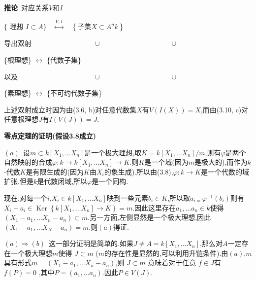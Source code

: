 \documentclass[UTF8]{book}
\begin{document}
		
		\textbf{推论}\ 对应关系$ V $和$ I $
		
		
		\centerline{$\{\text { 理想 } I \subset A \}\quad{\stackrel{ V , I }{\longleftrightarrow}} \quad\left\{\text {子集} X \subset A ^{ n } k \right\}$}
		
		
		导出双射$ \qquad\qquad\qquad\qquad\quad\cup\qquad\qquad\qquad\qquad\qquad\cup $
		

		\centerline{\{根理想\} \qquad $\longleftrightarrow$ \qquad \{代数子集\}}
		
		
		以及$ \qquad\qquad\qquad\qquad\qquad\quad\cup\qquad\qquad\qquad\qquad\qquad\cup $
		
		
		\centerline{\qquad\quad \{素理想\} \qquad $\longleftrightarrow$ \qquad \{不可约代数子集\}}
		
		
		上述双射成立时因为由(3.6, b)对任意代数集$ X $有$ V(I(X))  = X$,而由(3.10, c)对任意根理想$ J $有$ I(V(J))  = J$.
		
		
		\textbf{零点定理的证明(假设3.8成立)}
		
		
		$ (a) $\ 设$m \subset k \left[ X _{1}, \ldots X _{ n }\right]$是一个极大理想,取$K = k \left[ X _{1}, \ldots X _{ n }\right] / m$,则有$ \varphi $是两个自然映射的合成$ \varphi : k \to k \left[ X _{1}, \ldots X _{ n }\right] \to K$.则$ K $是一个域(因为$ m $是极大的),而作为$ k $-代数$ K $是有限生成的(因为$ K $由$ X_{i} $的象生成).所以由(3.8),$ \varphi : k \to K $是一个代数的域扩张.但是$ k $是代数闭域,所以$ \varphi $是一个同构.
		
		
		现在,对每一个$ i $,$X _{ i } \in k \left[ X _{1}, \ldots X _{ n }\right]$映到一些元素$ b_{i} \in K$,所以取$a _{ i =} \varphi^{-1}\left(b _{ i }\right)$则有$X _{ i }- a _{ i } \in \operatorname{Ker}\left\{ k \left[ X _{1}, \ldots X _{ n }\right] \rightarrow K \right\}= m .$因此这里存在$a _{1}, \ldots a _{ n } \in k$使得$\left(X _{1}- a _{1}, \ldots X _{ n }- a _{ n }\right) \subset m .$另一方面,左侧显然是一个极大理想,因此$\left(X _{1}- a _{1}, \ldots X _{ N }- a _{ n }\right)= m .$则$ (a) $得证.
		
		
		$ (a)  \Rightarrow (b) $\ 这一部分证明是简单的.如果$J \neq A = k \left[ X _{1}, \ldots X _{ n }\right]$,那么对$ A $一定存在一个极大理想$m$使得 $J \subset m$ ($ m $的存在性是显然的,可以利用升链条件).由$ (a) $,$ m $具有形式$m =\left(X _{1}- a _{1}, \ldots X _{ n }- a _{ n }\right)$,则 $J \subset m$ 意味着对于任意 $f \in J$有$f (P )=0$ ,其中$P =\left(a _{1}, \ldots a _{ n }\right) .$因此$P \in V (J )$.
		
\end{document}
